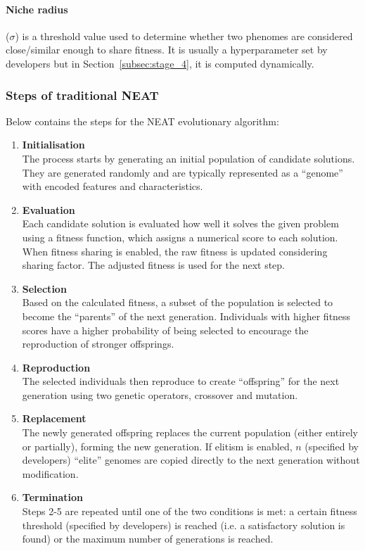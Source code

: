 \paragraph{Niche radius} ($\sigma$) is a threshold value used to determine whether two phenomes are considered close/similar enough to share fitness. It is usually a hyperparameter set by developers but in Section~\ref{subsec:stage_4}, it is computed dynamically. 


\subsubsection{Steps of traditional NEAT}
Below contains the steps for the NEAT evolutionary algorithm: 
\begin{enumerate}
    \item \textbf{Initialisation} \\
    The process starts by generating an initial population of candidate solutions. They are generated randomly and are typically represented as a ``genome'' with encoded features and characteristics. 

    \item \textbf{Evaluation} \\
    Each candidate solution is evaluated how well it solves the given problem using a fitness function, which assigns a numerical score to each solution. When fitness sharing is enabled, the raw fitness is updated considering sharing factor. The adjusted fitness is used for the next step. 

    \item \textbf{Selection} \\
    Based on the calculated fitness, a subset of the population is selected to become the ``parents'' of the next generation. Individuals with higher fitness scores have a higher probability of being selected to encourage the reproduction of stronger offsprings. 

    \item \textbf{Reproduction} \\
    The selected individuals then reproduce to create ``offspring'' for the next generation using two genetic operators, crossover and mutation. 

    \item \textbf{Replacement} \\
    The newly generated offspring replaces the current population (either entirely or partially), forming the new generation. If elitism is enabled, $n$ (specified by developers) ``elite'' genomes are copied directly to the next generation without modification. 

    \item \textbf{Termination} \\
    Steps 2-5 are repeated until one of the two conditions is met: a certain fitness threshold (specified by developers) is reached (i.e. a satisfactory solution is found) or the maximum number of generations is reached. 
\end{enumerate}


